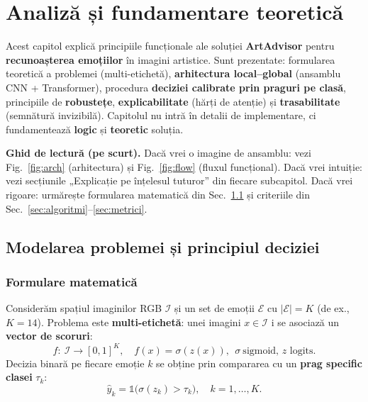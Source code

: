 \chapter{Analiză și fundamentare teoretică}
\label{ch:analiza}

\newcommand{\boxblock}[2][0.86\linewidth]{\fbox{\parbox{#1}{\centering #2}}}
\newcommand{\smallbox}[2][0.38\linewidth]{\fbox{\parbox{#1}{\centering #2}}}

Acest capitol explică principiile funcționale ale soluției \textbf{ArtAdvisor} pentru \textbf{recunoașterea emoțiilor} în imagini artistice. Sunt prezentate: formularea teoretică a problemei (multi-etichetă), \textbf{arhitectura local–global} (ansamblu CNN + Transformer), procedura \textbf{deciziei calibrate prin praguri pe clasă}, principiile de \textbf{robustețe}, \textbf{explicabilitate} (hărți de atenție) și \textbf{trasabilitate} (semnătură invizibilă). Capitolul nu intră în detalii de implementare, ci fundamentează \textbf{logic} și \textbf{teoretic} soluția.

\medskip
\noindent\textbf{Ghid de lectură (pe scurt).}
Dacă vrei o imagine de ansamblu: vezi Fig.~\ref{fig:arch} (arhitectura) și Fig.~\ref{fig:flow} (fluxul funcțional). Dacă vrei intuiție: vezi secțiunile „Explicație pe înțelesul tuturor” din fiecare subcapitol. Dacă vrei rigoare: urmărește formularea matematică din Sec.~\ref{sec:modelare} și criteriile din Sec.~\ref{sec:algoritmi}–\ref{sec:metrici}.

\section{Modelarea problemei și principiul deciziei}
\label{sec:modelare}

\subsection{Formulare matematică}
Considerăm spațiul imaginilor RGB $\mathcal{I}$ și un set de emoții $\mathcal{E}$ cu $|\mathcal{E}|=K$ (de ex., $K=14$). Problema este \textbf{multi-etichetă}: unei imagini $x\in\mathcal{I}$ i se asociază un \textbf{vector de scoruri}:
\[
f:\ \mathcal{I} \rightarrow [0,1]^K,\quad f(x)=\sigma(z(x)),\ \ \sigma\ \text{sigmoid, } z \text{ logits}.
\]
Decizia binară pe fiecare emoție $k$ se obține prin compararea cu un \textbf{prag specific clasei} $\tau_k$:
\[
\hat{y}_k = \mathbb{1}\big(\sigma(z_k) > \tau_k\big),\quad k=1,\dots,K.
\]

